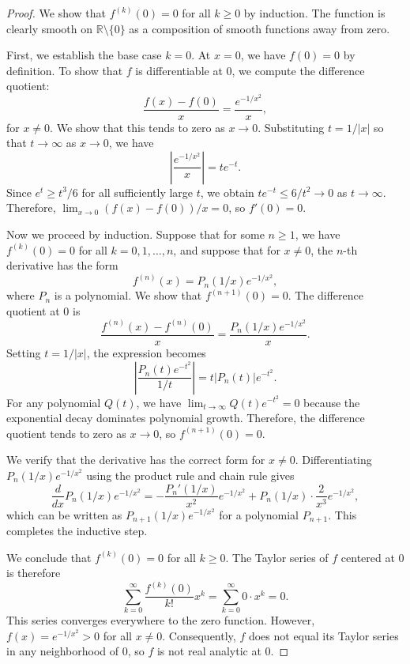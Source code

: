 \begin{proof}
We show that $f^{(k)}(0) = 0$ for all $k \geq 0$ by induction. The function is clearly smooth on $\mathbb{R} \setminus \{0\}$ as a composition of smooth functions away from zero.

First, we establish the base case $k = 0$. At $x = 0$, we have $f(0) = 0$ by definition. To show that $f$ is differentiable at $0$, we compute the difference quotient:
$$\frac{f(x) - f(0)}{x} = \frac{e^{-1/x^2}}{x},$$
for $x \neq 0$. We show that this tends to zero as $x \to 0$. Substituting $t = 1/|x|$ so that $t \to \infty$ as $x \to 0$, we have
$$\left|\frac{e^{-1/x^2}}{x}\right| = t e^{-t}.$$
Since $e^{t} \geq t^3 / 6$ for all sufficiently large $t$, we obtain $t e^{-t} \leq 6/t^2 \to 0$ as $t \to \infty$. Therefore, $\lim_{x \to 0} (f(x) - f(0))/x = 0$, so $f'(0) = 0$.

Now we proceed by induction. Suppose that for some $n \geq 1$, we have $f^{(k)}(0) = 0$ for all $k = 0, 1, \dots, n$, and suppose that for $x \neq 0$, the $n$-th derivative has the form
$$f^{(n)}(x) = P_n(1/x)e^{-1/x^2},$$
where $P_n$ is a polynomial. We show that $f^{(n+1)}(0) = 0$. The difference quotient at $0$ is
$$\frac{f^{(n)}(x) - f^{(n)}(0)}{x} = \frac{P_n(1/x)e^{-1/x^2}}{x}.$$
Setting $t = 1/|x|$, the expression becomes
$$\left|\frac{P_n(t)e^{-t^2}}{1/t}\right| = t |P_n(t)| e^{-t^2}.$$
For any polynomial $Q(t)$, we have $\lim_{t \to \infty} Q(t) e^{-t^2} = 0$ because the exponential decay dominates polynomial growth. Therefore, the difference quotient tends to zero as $x \to 0$, so $f^{(n+1)}(0) = 0$.

We verify that the derivative has the correct form for $x \neq 0$. Differentiating $P_n(1/x)e^{-1/x^2}$ using the product rule and chain rule gives
$$\frac{d}{dx} P_n(1/x)e^{-1/x^2} = -\frac{P_n'(1/x)}{x^2}e^{-1/x^2} + P_n(1/x) \cdot \frac{2}{x^3} e^{-1/x^2},$$
which can be written as $P_{n+1}(1/x)e^{-1/x^2}$ for a polynomial $P_{n+1}$. This completes the inductive step.

We conclude that $f^{(k)}(0) = 0$ for all $k \geq 0$. The Taylor series of $f$ centered at $0$ is therefore
$$\sum_{k=0}^\infty \frac{f^{(k)}(0)}{k!} x^k = \sum_{k=0}^\infty 0 \cdot x^k = 0.$$
This series converges everywhere to the zero function. However, $f(x) = e^{-1/x^2} > 0$ for all $x \neq 0$. Consequently, $f$ does not equal its Taylor series in any neighborhood of $0$, so $f$ is not real analytic at $0$.
\end{proof}
